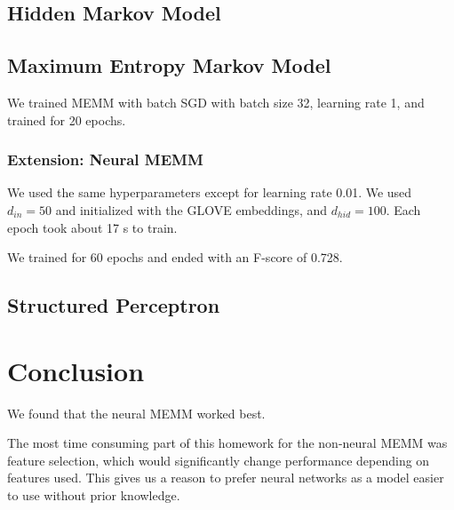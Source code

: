 \documentclass[11pt]{article}
\begin{document}
\subsection{Hidden Markov Model}


\subsection{Maximum Entropy Markov Model}

We trained MEMM with batch SGD with batch size 32, learning rate 1, and trained for 20 epochs. %

\subsubsection{Extension: Neural MEMM}

We used the same hyperparameters except for learning rate 0.01. We used $d_{in} = 50$ and initialized with the GLOVE embeddings, and $d_{hid} = 100$. Each epoch took about 17 s to train.

We trained for 60 epochs and ended with an F-score of 0.728.

\subsection{Structured Perceptron}


\section{Conclusion}

We found that the neural MEMM worked best. %

The most time consuming part of this homework for the non-neural MEMM was feature selection, which would significantly change performance depending on features used. This gives us a reason to prefer neural networks as a model easier to use without prior knowledge.



\end{document}
